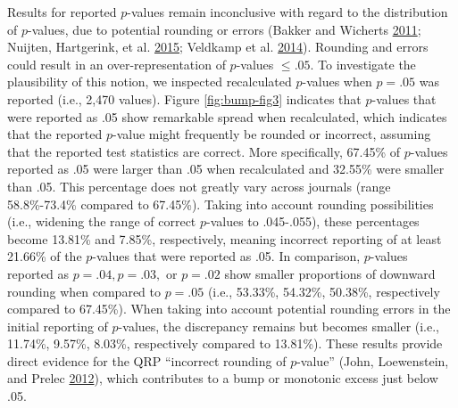 \documentclass[a5paper]{book}
\begin{document}
Results for reported \(p\)-values remain inconclusive with regard to the
distribution of \(p\)-values, due to potential rounding or errors
(Bakker and Wicherts
\protect\hyperlink{ref-doi:10.3758ux2fs13428-011-0089-5}{2011}; Nuijten,
Hartgerink, et al.
\protect\hyperlink{ref-doi:10.3758ux2fs13428-015-0664-2}{2015}; Veldkamp
et al.
\protect\hyperlink{ref-doi:10.1371ux2fjournal.pone.0114876}{2014}).
Rounding and errors could result in an over-representation of
\(p\)-values \(\leq.05\). To investigate the plausibility of this
notion, we inspected recalculated \(p\)-values when \(p=.05\) was
reported (i.e., 2,470 values). Figure \ref{fig:bump-fig3} indicates that
\(p\)-values that were reported as .05 show remarkable spread when
recalculated, which indicates that the reported \(p\)-value might
frequently be rounded or incorrect, assuming that the reported test
statistics are correct. More specifically, 67.45\% of \(p\)-values
reported as .05 were larger than .05 when recalculated and 32.55\% were
smaller than .05. This percentage does not greatly vary across journals
(range 58.8\%-73.4\% compared to 67.45\%). Taking into account rounding
possibilities (i.e., widening the range of correct \(p\)-values to
.045-.055), these percentages become 13.81\% and 7.85\%, respectively,
meaning incorrect reporting of at least 21.66\% of the \(p\)-values that
were reported as .05. In comparison, \(p\)-values reported as
\(p=.04, p=.03,\) or \(p=.02\) show smaller proportions of downward
rounding when compared to \(p=.05\) (i.e., 53.33\%, 54.32\%, 50.38\%,
respectively compared to 67.45\%). When taking into account potential
rounding errors in the initial reporting of \(p\)-values, the
discrepancy remains but becomes smaller (i.e., 11.74\%, 9.57\%, 8.03\%,
respectively compared to 13.81\%). These results provide direct evidence
for the QRP \enquote{incorrect rounding of \(p\)-value} (John,
Loewenstein, and Prelec
\protect\hyperlink{ref-doi:10.1177ux2f0956797611430953}{2012}), which
contributes to a bump or monotonic excess just below .05.
\end{document}

